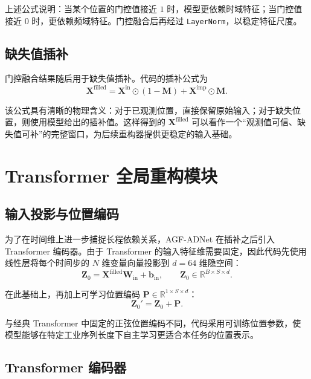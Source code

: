 上述公式说明：当某个位置的门控值接近 $1$ 时，模型更依赖时域特征；当门控值接近 $0$ 时，更依赖频域特征。门控融合后再经过 \texttt{LayerNorm}，以稳定特征尺度。

\subsection{缺失值插补}

门控融合结果随后用于缺失值插补。代码的插补公式为
\begin{equation}
    \mathbf{X}^{\mathrm{filled}}
    =
    \mathbf{X}^{\mathrm{in}} \odot (1-\mathbf{M})
    + \mathbf{X}^{\mathrm{imp}} \odot \mathbf{M}.
\end{equation}

该公式具有清晰的物理含义：对于已观测位置，直接保留原始输入；对于缺失位置，则使用模型给出的插补值。这样得到的 $\mathbf{X}^{\mathrm{filled}}$ 可以看作一个“观测值可信、缺失值可补”的完整窗口，为后续重构器提供更稳定的输入基础。

\section{Transformer 全局重构模块}

\subsection{输入投影与位置编码}

为了在时间维上进一步捕捉长程依赖关系，AGF-ADNet 在插补之后引入 Transformer 编码器。由于 Transformer 的输入特征维需要固定，因此代码先使用线性层将每个时间步的 $N$ 维变量向量投影到 $d=64$ 维隐空间：
\begin{equation}
    \mathbf{Z}_0 = \mathbf{X}^{\mathrm{filled}}\mathbf{W}_{\mathrm{in}} + \mathbf{b}_{\mathrm{in}},
    \qquad
    \mathbf{Z}_0 \in \mathbb{R}^{B \times S \times d}.
\end{equation}

在此基础上，再加上可学习位置编码 $\mathbf{P} \in \mathbb{R}^{1 \times S \times d}$：
\begin{equation}
    \mathbf{Z}_0' = \mathbf{Z}_0 + \mathbf{P}.
\end{equation}

与经典 Transformer 中固定的正弦位置编码不同，代码采用可训练位置参数，使模型能够在特定工业序列长度下自主学习更适合本任务的位置表示。

\subsection{Transformer 编码器}

